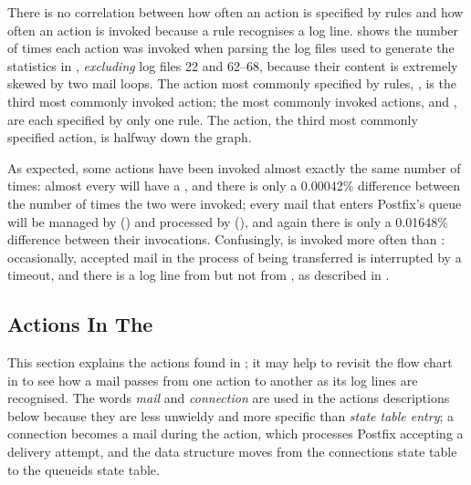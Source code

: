 There is no correlation between how often an action is specified by rules
and how often an action is invoked because a rule recognises a log line.
shows the number of times each action was invoked when parsing the
\numberOFlogFILES{} log files used to generate the statistics in
, \textit{excluding\/} log files 22 and
62--68, because their content is extremely skewed by two mail loops.  The
action most commonly specified by rules, , is
the third most commonly invoked action; the most commonly invoked actions,
 and , are each specified by only one
rule.  The  action, the third most commonly specified
action, is halfway down the graph.

As expected, some actions have been invoked almost exactly the same number
of times: almost every  will have a ,
and there is only a 0.00042\% difference between the number of times the
two were invoked; every mail that enters Postfix's queue will be managed by
 () and processed by 
(), and again there is only a 0.01648\%
difference between their invocations.  Confusingly,
 is invoked more often than
: occasionally, accepted mail in the process of being
transferred is interrupted by a timeout, and there is a log line from
 but not from , as described in
.



\subsection{Actions In The \parsernamelong{}}

\label{actions in detail in implementation}

This section explains the actions found in \parsername{}; it may help to
revisit the flow chart in  to see how a mail passes
from one action to another as its log lines are recognised.  The words
\textit{mail\/} and \textit{connection\/} are used in the actions
descriptions below because they are less unwieldy and more specific than
\textit{state table entry\/}; a connection becomes a mail during the
 action, which processes Postfix accepting a delivery
attempt, and the data structure moves from the connections state table to
the queueids state table.

